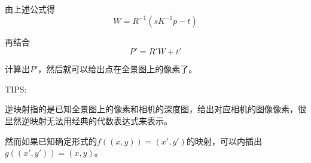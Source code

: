 \par 由上述公式得
\begin{equation}
  W = R^{-1} ( s K^{-1} p - t)
\end{equation}
\par 再结合
\begin{equation}
  P' = R' W + t'
\end{equation}
\par 计算出$P'$，然后就可以给出点在全景图上的像素了。
\par TIPS:
\par 逆映射指的是已知全景图上的像素和相机的深度图，给出对应相机的图像像素，很显然逆映射无法用经典的代数表达式来表示。
\par 然而如果已知确定形式的$f((x,y))=(x',y')$的映射，可以内插出$g((x',y'))=(x,y)$。
